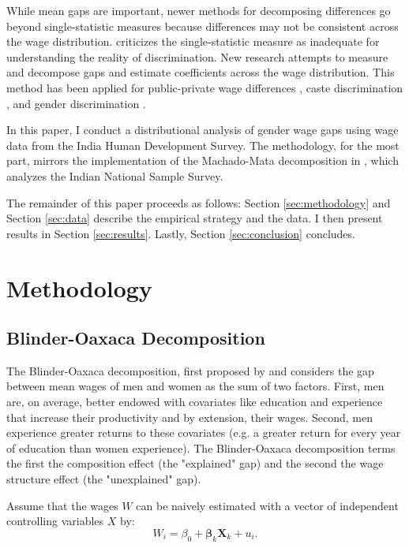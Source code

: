 \documentclass[12pt]{article}
\begin{document}
While mean gaps are important, newer methods for decomposing differences go beyond single-statistic measures because differences may not be consistent across the wage distribution. \citet{Jenkins1994} criticizes the single-statistic measure as inadequate for understanding the reality of discrimination.  New research attempts to measure and decompose gaps and estimate coefficients across the wage distribution. This method has been applied for public-private wage differences \citep{AzamPrakash2015}, caste discrimination \citep{Agrawal2014}, and gender discrimination \citep{Khanna2012}.

In this paper, I conduct a distributional analysis of gender wage gaps using wage data from the India Human Development Survey. The methodology, for the most part, mirrors the implementation of the Machado-Mata decomposition in \citet{Khanna2012}, which analyzes the Indian National Sample Survey.

The remainder of this paper proceeds as follows: Section \ref{sec:methodology} and Section \ref{sec:data} describe the empirical strategy and the data. I then present results in Section \ref{sec:results}. Lastly, Section \ref{sec:conclusion} concludes. 


\section{Methodology
\label{sec:methodology}}

\subsection{Blinder-Oaxaca Decomposition
\label{subsec:BOdecomp}}
The Blinder-Oaxaca decomposition, first proposed by \citet{Blinder1973} and \citet{Oaxaca1973} considers the gap between mean wages of men and women as the sum of two factors. First, men are, on average, better endowed with covariates like education and experience that increase their productivity and by extension, their wages. Second, men experience greater returns to these covariates (e.g. a greater return for every year of education than women experience). The Blinder-Oaxaca decomposition terms the first the composition effect (the "explained" gap) and the second the wage structure effect (the "unexplained" gap).

Assume that the wages $W$ can be naively estimated with a vector of independent controlling variables $X$ by:
\begin{equation}
	W_i = \beta_0 + \mathbf{\beta}_k \mathbf{X}_k + u_i 
.\end{equation}
\end{document}
